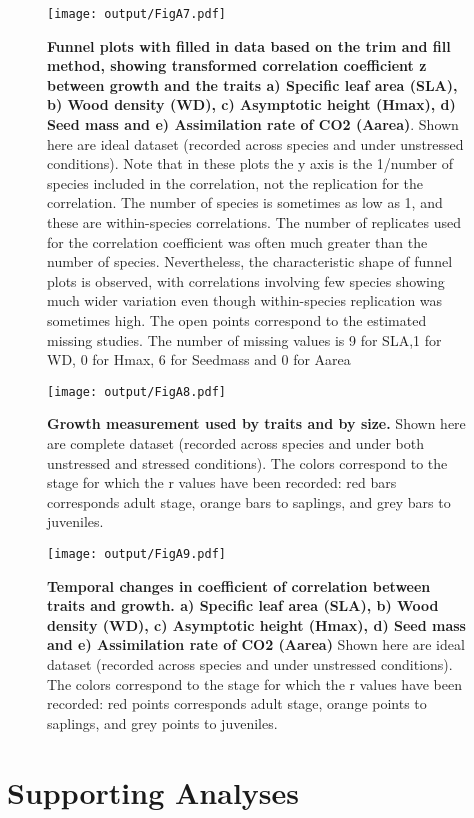\documentclass[a4paper]{article}\usepackage[]{graphicx}\usepackage[]{color}
\begin{document}
\begin{appendices}
\begin{figure}[h!]
\centering
\texttt{[image: output/FigA7.pdf]}
\caption{\textbf{Funnel plots with filled in data based on the trim and fill method, showing transformed correlation coefficient z between growth and the traits a) Specific leaf area (SLA), b) Wood density (WD), c) Asymptotic height (Hmax), d) Seed mass and e) Assimilation rate of CO2 (Aarea)}. Shown here are ideal dataset (recorded across species and under unstressed conditions).  Note that in these plots the y axis is the 1/number of species included in the correlation, not the replication for the correlation. The number of species is sometimes as low as 1, and these are within-species correlations. The number of replicates used for the correlation coefficient was often much greater than the number of species. Nevertheless, the characteristic shape of funnel plots is observed, with correlations involving few species showing much wider variation even though within-species replication was sometimes high. The open points correspond to the estimated missing studies. The number of missing values is 9 for SLA,1 for WD, 0 for Hmax, 6 for Seedmass and 0 for Aarea}
\label{FigA7}
\end{figure}

\begin{figure}[h!]
\centering
\texttt{[image: output/FigA8.pdf]}
\caption{\textbf{Growth measurement used by traits and by size.} Shown here are complete dataset (recorded across species and under both unstressed and stressed conditions). The colors correspond to the stage for which the r values have been recorded: red bars corresponds adult stage, orange bars to saplings, and grey bars to juveniles.}
\label{FigA8}
\end{figure}

\begin{figure}[h!]
\centering
\texttt{[image: output/FigA9.pdf]}
\caption{\textbf{Temporal changes in coefficient of correlation between traits and growth. a) Specific leaf area (SLA), b) Wood density (WD), c) Asymptotic height (Hmax), d) Seed mass and e) Assimilation rate of CO2 (Aarea)} Shown here are ideal dataset (recorded across species and under  unstressed conditions). The colors correspond to the stage for which the r values have been recorded: red points corresponds adult stage, orange points to saplings, and grey points to juveniles.}
\label{FigA9}
\end{figure}

\clearpage
\section{Supporting Analyses}\label{app:supp_info_analyses}

\end{appendices}
\end{document}
